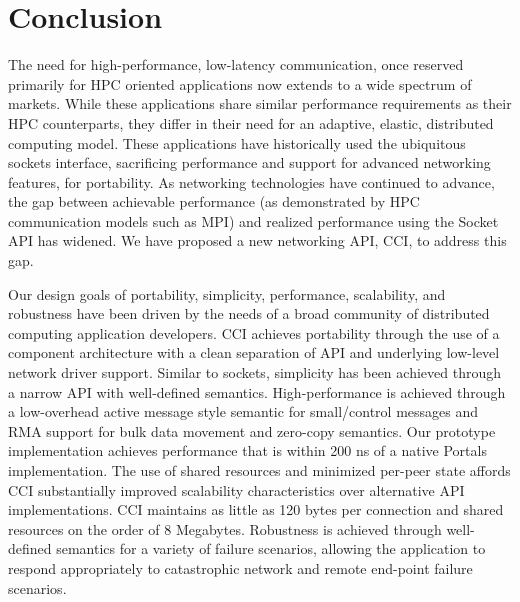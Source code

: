 
\section{Conclusion}

The need for high-performance, low-latency communication, once
reserved primarily for HPC oriented applications now extends to a wide
spectrum of markets. While these applications share similar
performance requirements as their HPC counterparts, they differ in
their need for an adaptive, elastic, distributed computing
model. These applications have historically used the ubiquitous
sockets interface, sacrificing performance and support for advanced
networking features, for portability. As networking technologies have
continued to advance, the gap between achievable performance (as
demonstrated by HPC communication models such as MPI) and realized
performance using the Socket API has widened. We have proposed a new
networking API, CCI, to address this gap. 

Our design goals of portability, simplicity, performance, scalability,
and robustness have been driven by the needs of a broad community of
distributed computing application developers. CCI achieves portability
through the use of a component architecture with a clean separation of
API and underlying low-level network driver support. Similar to
sockets, simplicity has been achieved through a narrow API with
well-defined semantics. High-performance is achieved through a
low-overhead active message style semantic for small/control messages
and RMA support for bulk data movement and zero-copy
semantics. Our prototype implementation achieves performance that is
within 200 ns of a native Portals implementation. The use of shared
resources and minimized per-peer state affords CCI substantially
improved scalability characteristics over alternative API
implementations. CCI maintains as little as 120 bytes per connection
and shared resources on the order of 8 Megabytes. Robustness is
achieved through well-defined semantics for a variety of failure
scenarios, allowing the application to respond appropriately to
catastrophic network and remote end-point failure scenarios.  


